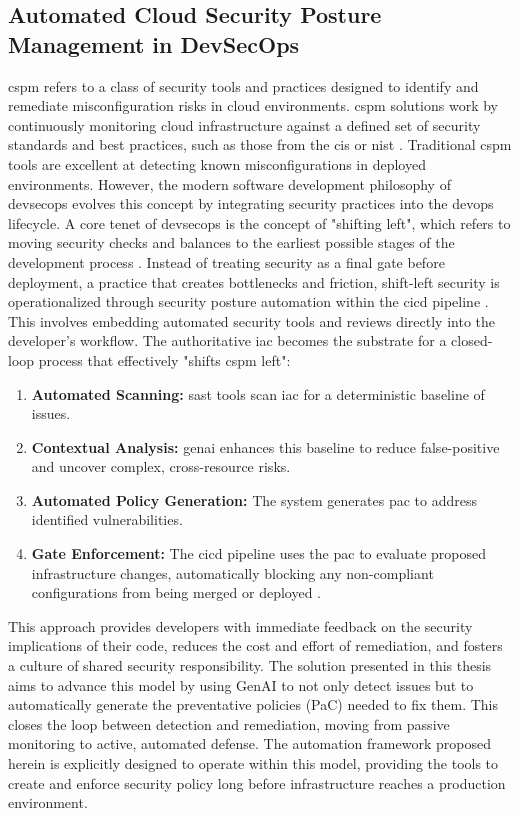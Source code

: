 \subsection{Automated Cloud Security Posture Management in DevSecOps}
\gls{cspm} refers to a class of security tools and practices designed to identify and remediate misconfiguration risks in cloud environments. \gls{cspm} solutions work by continuously monitoring cloud infrastructure against a defined set of security standards and best practices, such as those from the \gls{cis} or \gls{nist} \cite{tunc_cloud_2017}. Traditional \gls{cspm} tools are excellent at detecting known misconfigurations in deployed environments. However, the modern software development philosophy of \gls{devsecops} evolves this concept by integrating security practices into the \gls{devops} lifecycle. A core tenet of \gls{devsecops} is the concept of "shifting left", which refers to moving security checks and balances to the earliest possible stages of the development process \cite{akto_shift_2025}. Instead of treating security as a final gate before deployment, a practice that creates bottlenecks and friction, shift-left security is operationalized through security posture automation within the \gls{cicd} pipeline \cite{fu_ai_2025}. This involves embedding automated security tools and reviews directly into the developer's workflow. The authoritative \gls{iac} becomes the substrate for a closed-loop process that effectively "shifts \gls{cspm} left":
\begin{enumerate}
    \item \textbf{Automated Scanning:} \gls{sast} tools scan \gls{iac} for a deterministic baseline of issues.
    \item \textbf{Contextual Analysis:} \gls{genai} enhances this baseline to reduce \gls{false-positive} and uncover complex, cross-resource risks.
    \item \textbf{Automated Policy Generation:} The system generates \gls{pac} to address identified vulnerabilities.
    \item \textbf{Gate Enforcement:} The \gls{cicd} pipeline uses the \gls{pac} to evaluate proposed infrastructure changes, automatically blocking any non-compliant configurations from being merged or deployed \cite{gunathilaka_context-aware_2025-1}.
\end{enumerate}
This approach provides developers with immediate feedback on the security implications of their code, reduces the cost and effort of remediation, and fosters a culture of shared security responsibility. The solution presented in this thesis aims to advance this model by using GenAI to not only detect issues but to automatically generate the preventative policies (PaC) needed to fix them. This closes the loop between detection and remediation, moving from passive monitoring to active, automated defense. The automation framework proposed herein is explicitly designed to operate within this model, providing the tools to create and enforce security policy long before infrastructure reaches a production environment.

